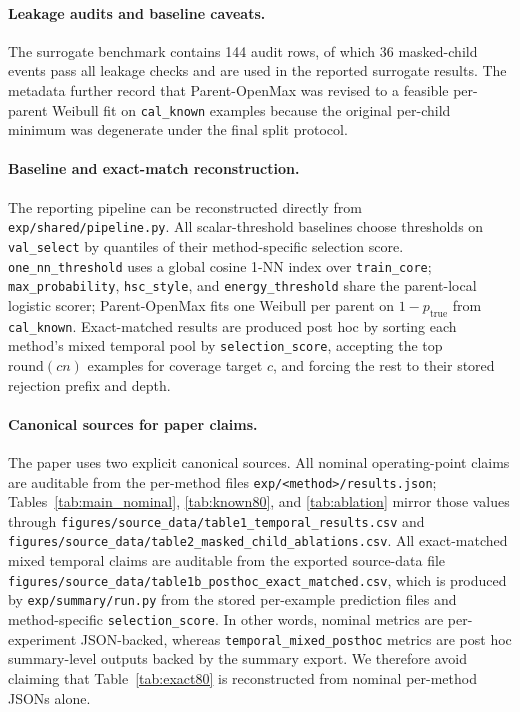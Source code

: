\documentclass{article}
\begin{document}
\paragraph{Leakage audits and baseline caveats.}
The surrogate benchmark contains 144 audit rows, of which 36 masked-child events pass all leakage checks and are used in the reported surrogate results. The metadata further record that Parent-OpenMax was revised to a feasible per-parent Weibull fit on \texttt{cal\_known} examples because the original per-child minimum was degenerate under the final split protocol.

\paragraph{Baseline and exact-match reconstruction.}
The reporting pipeline can be reconstructed directly from \texttt{exp/shared/pipeline.py}. All scalar-threshold baselines choose thresholds on \texttt{val\_select} by quantiles of their method-specific selection score. \texttt{one\_nn\_threshold} uses a global cosine 1-NN index over \texttt{train\_core}; \texttt{max\_probability}, \texttt{hsc\_style}, and \texttt{energy\_threshold} share the parent-local logistic scorer; Parent-OpenMax fits one Weibull per parent on $1-p_{\mathrm{true}}$ from \texttt{cal\_known}. Exact-matched results are produced post hoc by sorting each method's mixed temporal pool by \texttt{selection\_score}, accepting the top $\mathrm{round}(c n)$ examples for coverage target $c$, and forcing the rest to their stored rejection prefix and depth.

\paragraph{Canonical sources for paper claims.}
The paper uses two explicit canonical sources. All nominal operating-point claims are auditable from the per-method files \texttt{exp/<method>/results.json}; Tables~\ref{tab:main_nominal}, \ref{tab:known80}, and \ref{tab:ablation} mirror those values through \texttt{figures/source\_data/table1\_temporal\_results.csv} and \texttt{figures/source\_data/table2\_masked\_child\_ablations.csv}. All exact-matched mixed temporal claims are auditable from the exported source-data file \texttt{figures/source\_data/table1b\_posthoc\_exact\_matched.csv}, which is produced by \texttt{exp/summary/run.py} from the stored per-example prediction files and method-specific \texttt{selection\_score}. In other words, nominal metrics are per-experiment JSON-backed, whereas \texttt{temporal\_mixed\_posthoc} metrics are post hoc summary-level outputs backed by the summary export. We therefore avoid claiming that Table~\ref{tab:exact80} is reconstructed from nominal per-method JSONs alone.
\end{document}
